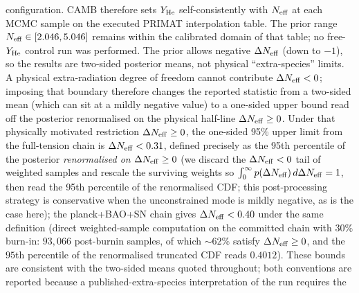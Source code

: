 \documentclass[aps,prd,twocolumn,superscriptaddress,showpacs,preprintnumbers,nofootinbib,longbibliography,floatfix]{revtex4-2}
\newcommand{\Neff}{N_{\rm eff}}
\begin{document}
configuration. CAMB therefore sets $Y_{\rm He}$ self-consistently with
$\Neff$ at each MCMC sample on the executed PRIMAT interpolation table.
The prior range $\Neff\in[2.046, 5.046]$ remains within the calibrated
domain of that table; no free-$Y_{\rm He}$ control run was performed.
The prior allows negative $\Delta\Neff$ (down to $-1$), so the results are
two-sided posterior means, not physical ``extra-species'' limits.
A physical extra-radiation degree of freedom cannot contribute
$\Delta\Neff < 0$; imposing that boundary therefore changes the reported
statistic from a two-sided mean (which can sit at a mildly negative value)
to a one-sided upper bound read off the posterior renormalised on the
physical half-line $\Delta\Neff\ge 0$. Under that physically motivated
restriction $\Delta\Neff\ge 0$, the
one-sided 95\% upper limit from the full-tension chain is
$\Delta\Neff < 0.31$, defined precisely as the 95th percentile of the
posterior \emph{renormalised on $\Delta\Neff \ge 0$} (we discard the
$\Delta\Neff < 0$ tail of weighted samples and rescale the surviving
weights so $\int_0^\infty p(\Delta\Neff)\,d\Delta\Neff = 1$, then read
the 95th percentile of the renormalised CDF; this post-processing strategy
is conservative when the unconstrained mode is mildly negative, as is the
case here); the planck+BAO+SN chain
gives $\Delta\Neff < 0.40$ under the same definition (direct
weighted-sample computation on the committed chain with $30\%$ burn-in:
$93{,}066$ post-burnin samples, of which $\sim 62\%$ satisfy
$\Delta\Neff\ge 0$, and the $95$th percentile of the renormalised
truncated CDF reads $0.4012$).  These bounds are consistent with the two-sided
means quoted throughout; both conventions are reported because a
published-extra-species interpretation of the run requires the
\end{document}
